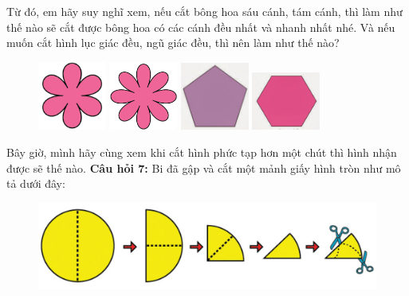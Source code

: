 Từ đó, em hãy suy nghĩ xem, nếu cắt bông hoa sáu cánh, tám cánh, thì làm như thế nào sẽ cắt được bông hoa có các cánh đều nhất và nhanh nhất nhé. Và nếu muốn cắt hình lục giác đều, ngũ giác đều, thì nên làm như thế nào? 
\begin{figure}[H]
	\centering
	\captionsetup{labelformat=empty}
	\captionsetup{justification=centering}
	\includegraphics[width =0.2\textwidth]{cat-16a}
	\hfill
	\includegraphics[width =0.2\textwidth]{cat-16b}
	\hfill
	\includegraphics[width =0.2\textwidth]{cat-16c}
	\hfill
	\includegraphics[width =0.2\textwidth]{cat-16d}	
	\vspace*{-5pt}
\end{figure}
Bây giờ, mình hãy cùng xem khi cắt hình phức tạp hơn một chút thì hình nhận được sẽ thế nào.
\vskip0.3cm
\textbf{\color{toancuabi}Câu hỏi $\pmb{7}$:} Bi đã gập và cắt một mảnh giấy hình tròn như mô tả dưới đây:
\begin{figure}[H]
	\vspace*{-5pt}	
	\captionsetup{labelformat=empty}
	\centering
	\captionsetup{justification=raggedleft}
	\includegraphics[width =1\textwidth]{cat-17}
	\vspace*{-10pt}
\end{figure}
